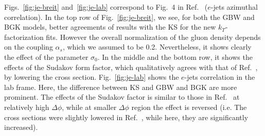 \documentclass[11pt]{article}
\numberwithin{equation}{section}
\numberwithin{table}{section}
\numberwithin{figure}{section}
\newcommand{\comment}[1]{\texttt{\color{red}#1}}
\begin{document}
Figs.~\ref{fig:je-breit} and~\ref{fig:je-lab} correspond to Fig.~4 in Ref.~\cite{vanHameren:2021sqc} ($e$-jets azimuthal correlation). 
In the top row of Fig.~\ref{fig:je-breit}, we see, for both the GBW and BGK models, better agreements of results with the KS for the new $k_T$-factorization fits. However the overall normalization of the gluon density depends on the coupling $\alpha_s$, which we assumed to be 0.2. Nevertheless, it shows clearly the effect of the parameter $\sigma_0$. In the middle and the bottom row, it shows the effects of the Sudakov form factor, which qualitatively agrees with that of Ref.~\cite{vanHameren:2021sqc}, by lowering the cross section.
Fig.~\ref{fig:je-lab} shows the $e$-jets correlation in the lab frame. Here, the difference between KS and GBW and BGK are more prominent. %
The effects of the Sudakov factor is similar to those in Ref.~\cite{vanHameren:2021sqc} at relatively high $\Delta \phi$, while at smaller $\Delta \phi$ region the effect is reversed (i.e. The cross sections were slightly lowered in Ref.~\cite{vanHameren:2021sqc}, while here, they are significantly increased). \\
\end{document}
